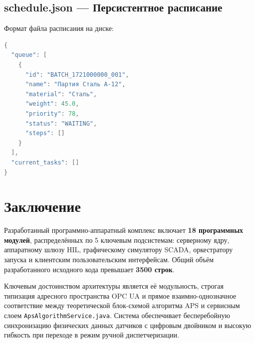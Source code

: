\documentclass[14pt, a4paper]{extarticle}
\begin{document}
\subsection{schedule.json --- Персистентное расписание}

Формат файла расписания на диске:
\begin{lstlisting}[language=Java, caption=Структура schedule.json]
{
  "queue": [
    {
      "id": "BATCH_1721000000_001",
      "name": "Партия Сталь А-12",
      "material": "Сталь",
      "weight": 45.0,
      "priority": 78,
      "status": "WAITING",
      "steps": []
    }
  ],
  "current_tasks": []
}
\end{lstlisting}

\newpage
\section{Заключение}

Разработанный программно-аппаратный комплекс включает \textbf{18 программных модулей}, распределённых по 5 ключевым подсистемам: серверному ядру, аппаратному шлюзу HIL, графическому симулятору SCADA, оркестратору запуска и клиентским пользовательским интерфейсам. Общий объём разработанного исходного кода превышает \textbf{3500 строк}.

Ключевым достоинством архитектуры является её модульность, строгая типизация адресного пространства OPC UA и прямое взаимно-однозначное соответствие между теоретической блок-схемой алгоритма APS и сервисным слоем \texttt{ApsAlgorithmService.java}. Система обеспечивает бесперебойную синхронизацию физических данных датчиков с цифровым двойником и высокую гибкость при переходе в режим ручной диспетчеризации.
\end{document}
